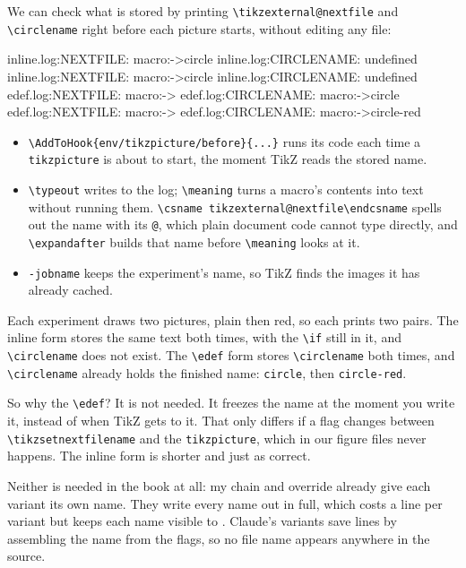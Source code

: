 \documentclass[11pt,a4paper]{article}
\newif\ifRed  %
\newcommand{\cs}[1]{\texttt{\textbackslash #1}}
\begin{document}
We can check what is stored by printing \cs{tikzexternal@nextfile} and \cs{circlename} right before each picture starts, without editing any file:

\begin{cmdout}
inline.log:NEXTFILE: macro:->circle\ifRed -red\fi
inline.log:CIRCLENAME: undefined
inline.log:NEXTFILE: macro:->circle\ifRed -red\fi
inline.log:CIRCLENAME: undefined
edef.log:NEXTFILE: macro:->\circlename
edef.log:CIRCLENAME: macro:->circle
edef.log:NEXTFILE: macro:->\circlename
edef.log:CIRCLENAME: macro:->circle-red
\end{cmdout}

\begin{itemize}[leftmargin=1.2em,itemsep=0pt]
  \item \verb|\AddToHook{env/tikzpicture/before}{...}| runs its code each time a \texttt{tikzpicture} is about to start, the moment TikZ reads the stored name.
  \item \verb|\typeout| writes to the log; \verb|\meaning| turns a macro's contents into text without running them. \verb|\csname tikzexternal@nextfile\endcsname| spells out the name with its \texttt{@}, which plain document code cannot type directly, and \verb|\expandafter| builds that name before \verb|\meaning| looks at it.
  \item \texttt{-jobname} keeps the experiment's name, so TikZ finds the images it has already cached.
\end{itemize}
Each experiment draws two pictures, plain then red, so each prints two pairs. The inline form stores the same text both times, with the \cs{if} still in it, and \cs{circlename} does not exist. The \cs{edef} form stores \cs{circlename} both times, and \cs{circlename} already holds the finished name: \texttt{circle}, then \texttt{circle-red}.

\begin{insight}{So why the \cs{edef}?}
It is not needed. It freezes the name at the moment you write it, instead of when TikZ gets to it. That only differs if a flag changes between \cs{tikzsetnextfilename} and the \texttt{tikzpicture}, which in our figure files never happens. The inline form is shorter and just as correct.

Neither is needed in the book at all: my chain and override already give each variant its own name. They write every name out in full, which costs a line per variant but keeps each name visible to . Claude's variants save lines by assembling the name from the flags, so no file name appears anywhere in the source.
\end{insight}
\end{document}
